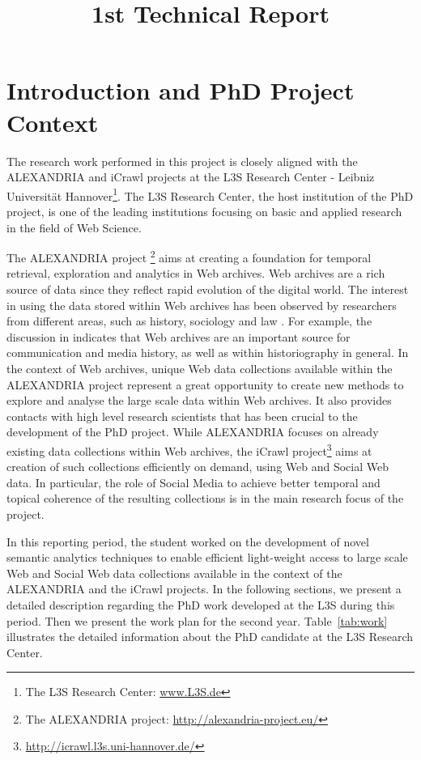 \documentclass[a4paper,11pt]{report}
\title{1st Technical Report}
\begin{document}
\maketitle
\chapter{Introduction and PhD Project Context}

The research work performed in this project is closely aligned with the ALEXANDRIA 
and iCrawl projects at the L3S Research Center -  
Leibniz Universit\"at Hannover\footnote{The L3S Research Center: \url{www.L3S.de}}.  
%
The L3S Research Center, the host institution of the PhD project, 
is one of the leading institutions
focusing on basic and applied research in the field of Web Science.  
% 

The ALEXANDRIA project \footnote{The ALEXANDRIA project: \url{http://alexandria-project.eu/}} 
aims at creating a foundation for temporal retrieval, exploration and analytics in Web archives.
%
Web archives are a rich source of data since they reflect rapid evolution
of the digital world. The interest in using the data
stored within Web archives has been observed by researchers from different
areas, such as history, sociology and law \cite{icrawlRequirements}. For example, 
the discussion in \cite{Brugger14} indicates that Web archives are an important source for
communication and media history, as well as within historiography in general.
%
In the context of Web archives, unique Web data collections available within 
the ALEXANDRIA project represent a great opportunity to create new
methods to explore and analyse the large scale data within Web archives.
It also provides contacts with high level
research scientists that has been crucial to the development of the PhD project.
%
While ALEXANDRIA focuses on already existing data collections within Web archives,
the iCrawl project\footnote{\url{http://icrawl.l3s.uni-hannover.de/}} 
aims at creation of such collections efficiently on demand, 
using Web and Social Web data. In particular, the role of Social Media to achieve
better temporal and topical coherence of the resulting collections is in the  
main research focus of the project.

In this reporting period, the student worked on the development of novel semantic analytics techniques 
to enable efficient light-weight access to large scale Web and Social Web data collections 
available in the context of the ALEXANDRIA and the iCrawl projects. 
%
In the following sections, we present a detailed description regarding the PhD work
developed at the L3S during this period. 
Then we present the work plan for the second year. 
%
Table~\ref{tab:work} illustrates the detailed information about the PhD
candidate at the L3S Research Center.
\end{document}
